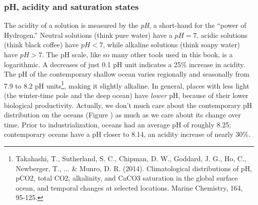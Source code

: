 \documentclass[amstex,12pt]{book}
\begin{document}
\subsubsection{pH, acidity and saturation states}
The acidity of a solution is measured by the \emph{pH}, a short-hand for the ``power of Hydrogen.'' Neutral solutions (think pure water) have a $pH=7$, acidic solutions (think black coffee) have $pH<7$, while alkaline solutions (think soapy water) have $pH>7$. The pH scale, like so many other tools used in this book, is a logarithmic. A decreases of just 0.1 pH unit indicates a 25\% increase in acidity. The pH of the contemporary shallow ocean varies regionally and seasonally from 7.9 to 8.2 pH units\footnote{Takahashi, T., Sutherland, S. C., Chipman, D. W., Goddard, J. G., Ho, C., Newberger, T., ... \& Munro, D. R. (2014). Climatological distributions of pH, pCO2, total CO2, alkalinity, and CaCO3 saturation in the global surface ocean, and temporal changes at selected locations. Marine Chemistry, 164, 95-125.}, making it slightly alkaline. In general, places with less light (the winter-time pole and the deep ocean) have \emph{lower} pH, because of their lower biological productivity. Actually, we don't much care about the contemporary pH distribution on the oceans (Figure \label{fig:ph_map}) as much as we care about its change over time. Prior to industrialization, oceans had an average pH of roughly 8.25; contemporary oceans have a pH closer to 8.14, an acidity increase of nearly 30\%. \\
\end{document}
